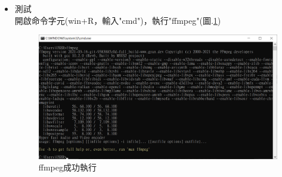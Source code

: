 \documentclass[14pt,a4paper]{report}  %
\begin{document}
\begin{itemize}
\item 測試\\
開啟命令字元(win+R，輸入"cmd")，執行"ffmpeg"(圖.\ref{fig.Q_ffmpeg-5})\\
\begin{figure}[hbt!]
\begin{center}
\includegraphics[width=15cm]{Q_ffmpeg-5}
\caption{\Large ffmpeg成功執行}
\label{fig.Q_ffmpeg-5}
\end{center}
\end{figure}
\end{itemize}
\end{document}
